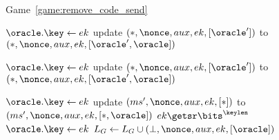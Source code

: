 \begin{figure}
\begin{leftfullpage}
\begin{adjustbox}{tabular={cc},Trim=0.9ex 0 0 0, width=\textwidth}
\begin{adjustbox}{minipage=[t][]{\codewidth},fbox}
\begin{algorithmic}[1]
		\end{algorithmic}
	\end{adjustbox}
	
	\\
	
	\begin{adjustbox}{minipage=[t][]{\codewidth},fbox}
		\begin{algorithmic}[1]			
		
			\State {}
			\Comment Game~\ref{game:remove_code_send}
			
				\State $\oracle.\key \gets ek$
				\State update $(*, \nonce, aux, ek, [\oracle'])$ to $(*, \nonce, aux, ek, [\oracle', \oracle])$
		
			\color{black}
		
			\State \hspace*{-\algorithmicindent} 
				\State $\oracle.\key \gets ek$
				\State update $(*, \nonce, aux, ek, [\oracle'])$ to $(*, \nonce, aux, ek, [\oracle', \oracle])$ 
			
			\color{black}
			
			\State \hspace*{-\algorithmicindent} 
			 \label{alg:line:send_game_hops_CheckKey}	
				\State $\oracle.\key \gets ek$
				\State update\hspace*{-0.9pt} $(ms', \nonce, aux, ek, [*])$ \hspace*{-0.5pt}to\hspace*{-0.5pt} $(ms', \nonce, aux, ek, [*,\oracle])$\hspace{-2pt}
			\color{black}		
			\Else 
				\State {}
				\State $ek \getsr \bits^\keylen$
				\color{black}
				\State $\oracle.\key \gets ek$
				\color{black}
				\State $L_G \gets L_G \cup  (\bot, \nonce, aux, ek, [\oracle])$\label{alg:line:send_game_drop_ms}
			\EndIf
			

\end{algorithmic}
\end{adjustbox}
\end{adjustbox}
\end{leftfullpage}
\end{figure}

